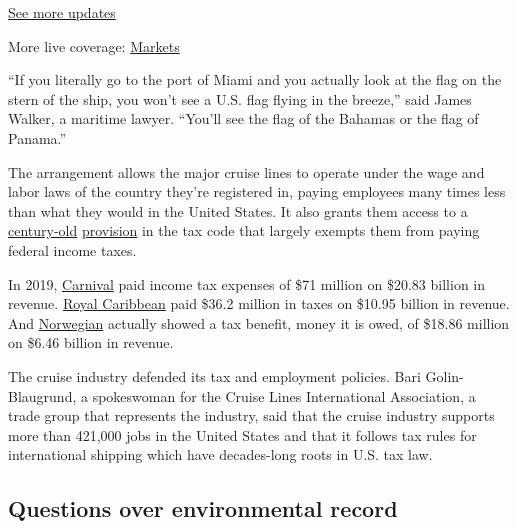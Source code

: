 \href{https://www.nytimes3xbfgragh.onion/2020/08/20/world/coronavirus-covid.html?action=click\&pgtype=Article\&state=default\&region=MAIN_CONTENT_1\&context=storylines_live_updates}{See
more updates}

More live coverage:
\href{https://www.nytimes3xbfgragh.onion/live/2020/08/20/business/stock-market-today-coronavirus?action=click\&pgtype=Article\&state=default\&region=MAIN_CONTENT_1\&context=storylines_live_updates}{Markets}

``If you literally go to the port of Miami and you actually look at the
flag on the stern of the ship, you won't see a U.S. flag flying in the
breeze,'' said James Walker, a maritime lawyer. ``You'll see the flag of
the Bahamas or the flag of Panama.''

The arrangement allows the major cruise lines to operate under the wage
and labor laws of the country they're registered in, paying employees
many times less than what they would in the United States. It also
grants them access to a
\href{https://scholarlycommons.law.case.edu/cgi/viewcontent.cgi?article=2163\&context=jil}{century-old}
\href{https://www.law.cornell.edu/uscode/text/26/883}{provision} in the
tax code that largely exempts them from paying federal income taxes.

In 2019,
\href{https://www.google.com/url?q=https://www.sec.gov/cgi-bin/viewer?action\%3Dview\%26cik\%3D1125259\%26accession_number\%3D0000815097-20-000003\%26xbrl_type\%3Dv\%23\&source=gmail\&ust=1585410524611000\&usg=AFQjCNEwHA5U1d_yqr4lwtLHFnNItD4kcw}{Carnival}
paid income tax expenses of \$71 million on \$20.83 billion in revenue.
\href{https://www.sec.gov/ix?doc=/Archives/edgar/data/884887/000088488720000009/rcl-20191231.htm}{Royal
Caribbean} paid \$36.2 million in taxes on \$10.95 billion in revenue.
And
\href{https://www.sec.gov/cgi-bin/viewer?action=view\&cik=1513761\&accession_number=0001558370-20-001661\&xbrl_type=v}{Norwegian}
actually showed a tax benefit, money it is owed, of \$18.86 million on
\$6.46 billion in revenue.

The cruise industry defended its tax and employment policies. Bari
Golin-Blaugrund, a spokeswoman for the Cruise Lines International
Association, a trade group that represents the industry, said that the
cruise industry supports more than 421,000 jobs in the United States and
that it follows tax rules for international shipping which have
decades-long roots in U.S. tax law.

\hypertarget{questions-over-environmental-record}{%
\subsection{Questions over environmental
record}\label{questions-over-environmental-record}}

